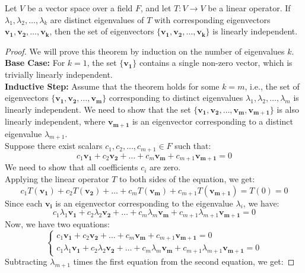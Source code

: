 \documentclass[openany]{book}
\begin{document}
\begin{mytheorem}
    Let $V$ be a vector space over a field $F$, and let $T: V \to V$ be a linear operator. If $\lambda_1, \lambda_2, \ldots, \lambda_k$ are distinct eigenvalues of $T$ with corresponding eigenvectors $\mathbf{v_1}, \mathbf{v_2}, \ldots, \mathbf{v_k}$, then the set of eigenvectors $\{\mathbf{v_1}, \mathbf{v_2}, \ldots, \mathbf{v_k}\}$ is linearly independent.
\end{mytheorem}
\begin{proof}
    We will prove this theorem by induction on the number of eigenvalues $k$. \\
    \textbf{Base Case:} For $k = 1$, the set $\{\mathbf{v_1}\}$ contains a single non-zero vector, which is trivially linearly independent. \\
    \textbf{Inductive Step:} Assume that the theorem holds for some $k = m$, i.e., the set of eigenvectors $\{\mathbf{v_1}, \mathbf{v_2}, \ldots, \mathbf{v_m}\}$ corresponding to distinct eigenvalues $\lambda_1, \lambda_2, \ldots, \lambda_m$ is linearly independent. We need to show that the set $\{\mathbf{v_1}, \mathbf{v_2}, \ldots, \mathbf{v_m}, \mathbf{v_{m+1}}\}$ is also linearly independent, where $\mathbf{v_{m+1}}$ is an eigenvector corresponding to a distinct eigenvalue $\lambda_{m+1}$. \\
    Suppose there exist scalars $c_1, c_2, \ldots, c_{m+1} \in F$ such that:
    $$c_1\mathbf{v_1} + c_2\mathbf{v_2} + \ldots + c_m\mathbf{v_m} + c_{m+1}\mathbf{v_{m+1}} = 0$$
    We need to show that all coefficients $c_i$ are zero. \\
    Applying the linear operator $T$ to both sides of the equation, we get:
    $$c_1T(\mathbf{v_1}) + c_2T(\mathbf{v_2}) + \ldots + c_mT(\mathbf{v_m}) + c_{m+1}T(\mathbf{v_{m+1}}) = T(0) = 0$$
    Since each $\mathbf{v_i}$ is an eigenvector corresponding to the eigenvalue $\lambda_i$, we have:
    $$c_1\lambda_1\mathbf{v_1} + c_2\lambda_2\mathbf{v_2} + \ldots + c_m\lambda_m\mathbf{v_m} + c_{m+1}\lambda_{m+1}\mathbf{v_{m+1}} = 0$$
    Now, we have two equations:
    \[\begin{cases}
    c_1\mathbf{v_1} + c_2\mathbf{v_2} + \ldots + c_m\mathbf{v_m} + c_{m+1}\mathbf{v_{m+1}} = 0 \\
    c_1\lambda_1\mathbf{v_1} + c_2\lambda_2\mathbf{v_2} + \ldots + c_m\lambda_m\mathbf{v_m} + c_{m+1}\lambda_{m+1}\mathbf{v_{m+1}} = 0
    \end{cases}\]
    Subtracting $\lambda_{m+1}$ times the first equation from the second equation, we get:

\end{proof}
\end{document}
